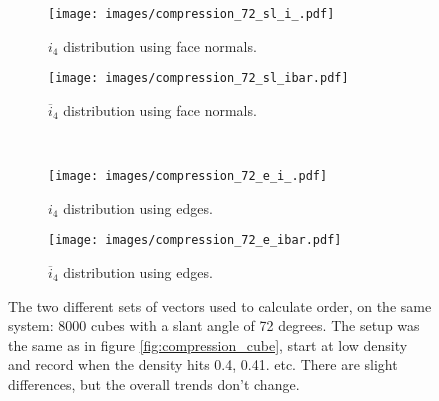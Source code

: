 \documentclass[thesis]{subfiles}
\begin{document}
\begin{figure}[H]
	\centering
	\begin{subfigure}{0.48\textwidth}
		\centering
		\texttt{[image: images/compression\_72\_sl\_i\_.pdf]}
		\caption{$i_4$ distribution using face normals.}
	\end{subfigure}
	\begin{subfigure}{0.51\textwidth}
		\centering
		\texttt{[image: images/compression\_72\_sl\_ibar.pdf]}
		\caption{$\overline i_4$ distribution using face normals.}
	\end{subfigure}\\\vspace{10pt}
	\begin{subfigure}{0.48\textwidth}
		\centering
		\texttt{[image: images/compression\_72\_e\_i\_.pdf]}
		\caption{$i_4$ distribution using edges.}
	\end{subfigure}
	\begin{subfigure}{0.51\textwidth}
		\centering
		\texttt{[image: images/compression\_72\_e\_ibar.pdf]}
		\caption{$\overline i_4$ distribution using edges.}
	\end{subfigure}
	\caption{The two different sets of vectors used to calculate order, on the same system: 8000 cubes with a slant angle of 72 degrees. The setup was the same as in figure \ref{fig:compression_cube}, start at low density and record when the density hits 0.4, 0.41. etc. There are slight differences, but the overall trends don't change.}
	\label{fig:orient_comparison}
\end{figure}
\end{document}
